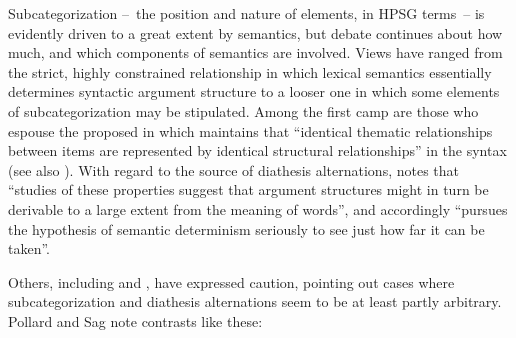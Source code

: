 \documentclass[output=paper
                ,modfonts
                ,nonflat
	        ,collection
	        ,collectionchapter
	        ,collectiontoclongg
 	        ,biblatex
                ,babelshorthands
                ,newtxmath
                ,draftmode
                ,colorlinks, citecolor=brown
]{./langsci/langscibook}
\begin{document}
Subcategorization --~the position and nature of \argst elements, in HPSG terms~-- is evidently driven to a great extent by semantics,
but debate continues about how much, and which components of semantics are involved.
Views have ranged from the strict, highly constrained relationship in which lexical semantics essentially determines syntactic argument structure to a looser one in which some elements of subcategorization may be stipulated.
Among  the first camp are those who espouse the   proposed in \citet[46]{Baker1988} which maintains that ``identical thematic relationships between items are represented by identical structural relationships'' in the syntax (see also \citealt{Baker1997}).
With regard to the source of  diathesis alternations, \citet[12--13]{Levin1993} notes that ``studies of these properties suggest that argument structures might in turn be derivable to a large extent from the meaning of words'', and accordingly ``pursues the hypothesis of semantic determinism seriously to see just how far it can be taken''.

Others, including \citet[Section 5.3]{pollard+sag:1987} and \citet[Section 5.1]{Davis2001}, have expressed caution, pointing out cases where subcategorization and diathesis alternations  seem to be at least partly arbitrary.
Pollard and Sag note contrasts like these:
\end{document}
